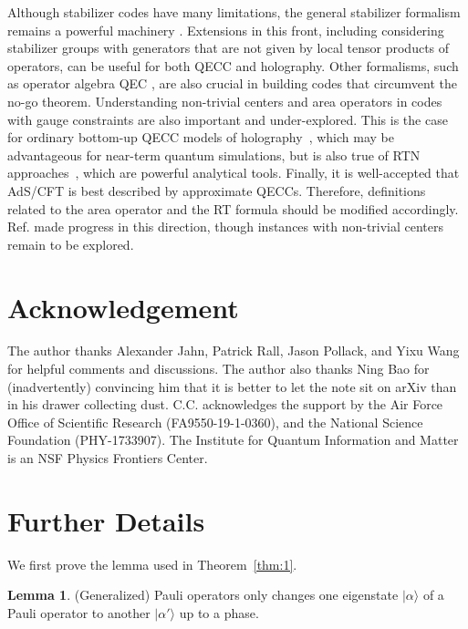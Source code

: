 \documentclass[%
 reprint,
superscriptaddress,
nofootinbib,
 amsmath,amssymb,
 aps,
prx,
floatfix,
]{revtex4-2}
\theoremstyle{definition}
\newtheorem{lemma}{Lemma}[section]
\numberwithin{equation}{section}
\begin{document}
Although stabilizer codes have many limitations, the general stabilizer formalism remains a powerful machinery \cite{XS,XP,CWS}. Extensions in this front, including considering stabilizer groups with generators that are not given by local tensor products of operators, can be useful for both QECC and holography. Other formalisms, such as operator algebra QEC \cite{OAQEC1,OAQEC2,STABOAQEC}, are also crucial in building codes that circumvent the no-go theorem. Understanding non-trivial centers and area operators in codes with gauge constraints are also important and under-explored. This is the case for ordinary bottom-up QECC models of holography~\cite{Dolev:2021ofc}, which may be advantageous for near-term quantum simulations, but is also true of RTN approaches~\cite{Qi:2022lbd}, which are powerful analytical tools. 
Finally, it is well-accepted that AdS/CFT is best described by approximate QECCs. Therefore, definitions related to the area operator and the RT formula should be modified accordingly.  Ref.\cite{AP2021} made progress in this direction, though instances with non-trivial centers remain to be explored.

\section*{Acknowledgement}
The author thanks Alexander Jahn, Patrick Rall, Jason Pollack, and Yixu Wang for helpful comments and discussions. The author also thanks Ning Bao for (inadvertently) convincing him that it is better to let the note sit on arXiv than in his drawer collecting dust. C.C. acknowledges the support by the Air Force Office of Scientific Research (FA9550-19-1-0360), and the National Science Foundation (PHY-1733907). The Institute for Quantum Information and Matter is an NSF Physics Frontiers Center.





 

\appendix
\section{Further Details}\label{app:1}
We first prove the lemma used in Theorem~\ref{thm:1}.
\begin{lemma}\label{lemma:1}
(Generalized) Pauli operators only changes one eigenstate $|\alpha\rangle$ of a Pauli operator to another $|\alpha'\rangle$ up to a phase. 
\end{lemma}
\end{document}
